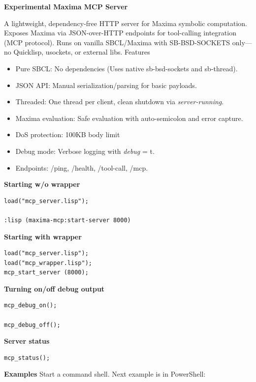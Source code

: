 \documentclass[12pt]{article}
\begin{document}
	

\textbf{Experimental Maxima MCP Server}

A lightweight, dependency-free HTTP server for Maxima symbolic
computation. Exposes Maxima via JSON-over-HTTP endpoints for
tool-calling integration (MCP protocol). Runs on vanilla SBCL/Maxima
with SB-BSD-SOCKETS only---no Quicklisp, usockets, or external libs.
\hspace{0pt} Features

\begin{itemize}
\item
  Pure SBCL: No dependencies (Uses native sb-bsd-sockets and sb-thread).
\item
  JSON API: Manual serialization/parsing for basic payloads.
\item
  Threaded: One thread per client, clean shutdown via
  \emph{server-running}.
\item
  Maxima evaluation: Safe evaluation with auto-semicolon and error
  capture.
\item
  DoS protection: 100KB body limit
\item
  Debug mode: Verbose logging with \emph{debug} = t.
\item
  Endpoints: /ping, /health, /tool-call, /mcp.
\end{itemize}

\textbf{Starting w/o  wrapper}

\begin{verbatim}
load("mcp_server.lisp");

:lisp (maxima-mcp:start-server 8000)
\end{verbatim}

\textbf{Starting with wrapper}

\begin{verbatim}
load("mcp_server.lisp");
load("mcp_wrapper.lisp");
mcp_start_server (8000);
\end{verbatim}

\textbf{Turning on/off debug output}

\begin{verbatim}
mcp_debug_on();

mcp_debug_off();
\end{verbatim}

\textbf{Server status}

\begin{verbatim}
mcp_status();
\end{verbatim}

\textbf{Examples} Start a command shell. Next example is in PowerShell:
\end{document}
